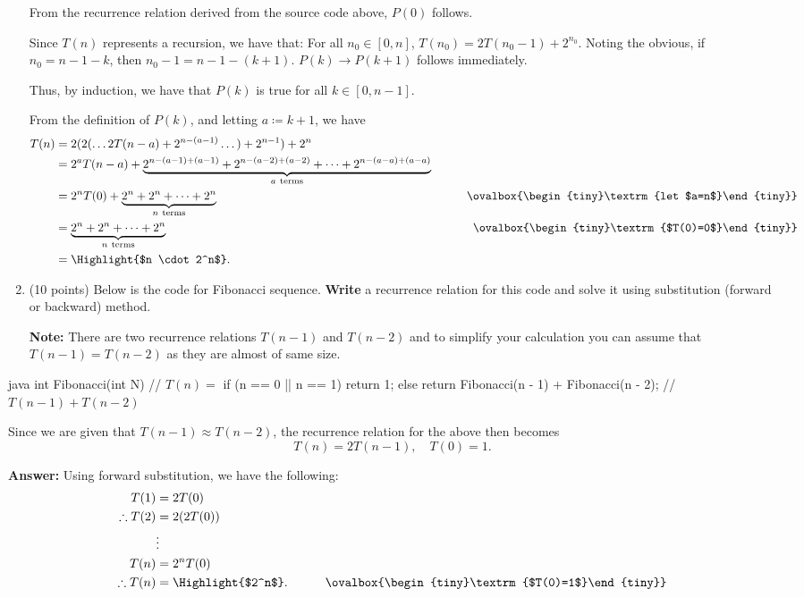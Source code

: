 \documentclass[12pt, a4paper]{article}
\newcommand*{\Comment}[1]{\tag*{\ovalbox{\begin{tiny}%
  \textrm{#1}%
\end{tiny}}}}
\begin{document}
\begin{enumerate}[resume]
\begin{enumerate}
  \end{enumerate}

  From the recurrence relation derived from the source code above, $P(0)$ follows.

  Since $T(n)$ represents a recursion, we have that:
  For all $n_0\in [0,n]$, $T(n_0) = 2T(n_0-1)+2^{n_0}$.
  Noting the obvious, if $n_0=n-1-k$, then $n_0-1=n-1-(k+1)$.
  $P(k)\rightarrow P(k+1)$ follows immediately.

  Thus, by induction, we have that $P(k)$ is true for all $k\in [0,n-1]$.

  From the definition of $P(k)$, and letting $a\coloneqq k+1$, we have
  \begin{align*}
    T(n)
      &= 2(2(\dots 2T(n-a) + 2^{n-(a-1)} \dots) + 2^{n-1}) + 2^n \\
      &= 2^a T(n-a) + \underbrace{2^{n-(a-1)+(a-1)} + 2^{n-(a-2)+(a-2)} + \cdots + 2^{n-(a-a)+(a-a)}}_{a\ \textrm{terms}} \\
      &= 2^n T(0) + \underbrace{2^n + 2^n + \cdots + 2^n}_{n\ \textrm{terms}}
        & \Comment{let $a=n$} \\
      &= \underbrace{2^n + 2^n + \cdots + 2^n}_{n\ \textrm{terms}}
        & \Comment{$T(0)=0$} \\
      &= \Highlight{$n \cdot 2^n$}.
  \end{align*}



  \newpage



  \item (10 points) Below is the code for Fibonacci sequence. \textbf{Write} a recurrence relation for this code and solve it using substitution (forward or backward) method.
  
  \textbf{Note:} There are two recurrence relations $T(n-1)$ and $T(n-2)$ and to simplify your calculation you can assume that $T(n-1)=T(n-2)$ as they are almost of same size.

\end{enumerate}

\begin{MintedUnbreakableCodeBlock}{java}
      int Fibonacci(int N) {                          // $T(n)=$
        if (n == 0 || n == 1) {
          return 1;
        }
        else {
          return Fibonacci(n - 1) + Fibonacci(n - 2); // $T(n-1)+T(n-2)$
        }
      }
\end{MintedUnbreakableCodeBlock}

Since we are given that $T(n-1) \approx T(n-2)$,
the recurrence relation for the above then becomes
\begin{equation*}
  T(n) = 2T(n-1), \quad T(0) = 1.
\end{equation*}

\textbf{Answer:} Using forward substitution, we have the following:
\begin{align*}
  T(1) &= 2T(0) \\
  \therefore T(2) &= 2(2T(0)) \\
  &\vdots \\
  T(n) &= 2^n T(0) \\
  \therefore T(n) &= \Highlight{$2^n$}.
    & \Comment{$T(0)=1$}
\end{align*}
\end{document}

